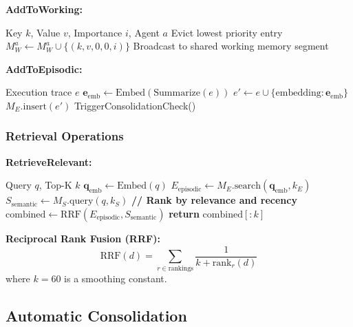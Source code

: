 \documentclass{article}
\theoremstyle{plain}
\theoremstyle{definition}
\theoremstyle{remark}
\begin{document}
\textbf{AddToWorking:}
\begin{algorithm}[H]
	\begin{algorithmic}[1]
		\REQUIRE Key $k$, Value $v$, Importance $i$, Agent $a$
		\STATE Evict lowest priority entry
		\ENDIF
		\STATE $M_W^a \leftarrow M_W^a \cup \{(k, v, 0, 0, i)\}$
		\STATE Broadcast to shared working memory segment
		\ENDIF
	\end{algorithmic}
\end{algorithm}

\textbf{AddToEpisodic:}
\begin{algorithm}[H]
	\begin{algorithmic}[1]
		\REQUIRE Execution trace $e$
		\STATE $\mathbf{e}_{\text{emb}} \leftarrow \text{Embed}(\text{Summarize}(e))$
		\STATE $e' \leftarrow e \cup \{\text{embedding}: \mathbf{e}_{\text{emb}}\}$
		\STATE $M_E.\text{insert}(e')$
		\STATE TriggerConsolidationCheck()
	\end{algorithmic}
\end{algorithm}

\subsubsection{Retrieval Operations}

\textbf{RetrieveRelevant:}
\begin{algorithm}[H]
	\begin{algorithmic}[1]
		\REQUIRE Query $q$, Top-K $k$
		\STATE $\mathbf{q}_{\text{emb}} \leftarrow \text{Embed}(q)$
		\STATE $E_{\text{episodic}} \leftarrow M_E.\text{search}(\mathbf{q}_{\text{emb}}, k_E)$
		\STATE $S_{\text{semantic}} \leftarrow M_S.\text{query}(q, k_S)$
		\STATE \textbf{// Rank by relevance and recency}
		\STATE $\text{combined} \leftarrow \text{RRF}(E_{\text{episodic}}, S_{\text{semantic}})$
		\STATE \textbf{return} $\text{combined}[:k]$
	\end{algorithmic}
\end{algorithm}

\textbf{Reciprocal Rank Fusion (RRF):}
\begin{equation}
	\text{RRF}(d) = \sum_{r \in \text{rankings}} \frac{1}{k + \text{rank}_r(d)}
\end{equation}
where $k = 60$ is a smoothing constant.

\subsection{Automatic Consolidation}
\label{sec:uma_consolidation}
\end{document}
